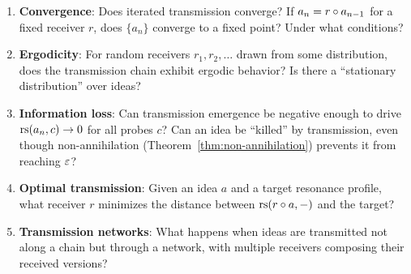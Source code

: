 \begin{enumerate}
    \item \textbf{Convergence}: Does iterated transmission converge?
    If $a_n = r \circ a_{n-1}$ for a fixed receiver $r$, does
    $\{a_n\}$ converge to a fixed point? Under what conditions?

    \item \textbf{Ergodicity}: For random receivers $r_1, r_2, \ldots$
    drawn from some distribution, does the transmission chain exhibit
    ergodic behavior? Is there a ``stationary distribution'' over ideas?

    \item \textbf{Information loss}: Can transmission emergence be
    negative enough to drive $\mathrm{rs}(a_n, c) \to 0$ for all probes $c$?
    Can an idea be ``killed'' by transmission, even though non-annihilation
    (Theorem~\ref{thm:non-annihilation}) prevents it from reaching $\varepsilon$?

    \item \textbf{Optimal transmission}: Given an idea $a$ and a target
    resonance profile, what receiver $r$ minimizes the distance between
    $\mathrm{rs}(r \circ a, -)$ and the target?

    \item \textbf{Transmission networks}: What happens when ideas are
    transmitted not along a chain but through a network, with multiple
    receivers composing their received versions?
\end{enumerate}


